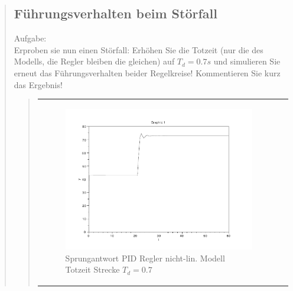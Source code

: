 \begin{quote}
    
    \subsection{Führungsverhalten beim Störfall}
    Aufgabe:\\
    Erproben sie nun einen Störfall: Erhöhen Sie die Totzeit (nur die des Modells, die Regler bleiben die gleichen)
    auf $T_d = 0.7s$ und simulieren Sie erneut das Führungsverhalten beider Regelkreise! Kommentieren Sie kurz das
    Ergebnis!\vspace{1em}
    
    \begin{quote}
 
            \begin{center}
                \begin{tabular}{ll}
                
                \hspace{-2.5cm}
                    \begin{minipage}{0.6\textwidth}
                        \begin{figure}[H]
                            \includegraphics[scale=0.4, trim = 0cm 0cm 0cm
                            0cm, clip]
                            {./Bilder/4_5_Td_04_K_tilde}
                              \caption{Sprungantwort PID Regler nicht-lin. Modell Totzeit Strecke $T_d = 0.7$}
                        \end{figure}
                    \end{minipage}
                    

\end{tabular}
\end{center}
\end{quote}
\end{quote}
